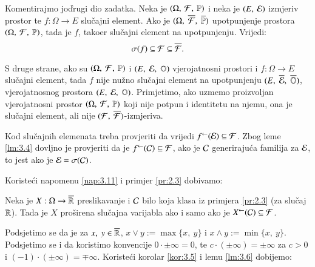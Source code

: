 \begin{rj}
    Komentirajmo jo\v drugi dio zadatka.
    Neka je $(\Omega, \: \mathcal{F}, \: \mathbb{P})$ i neka je $({E}, \: {\mathcal{E}})$ izmjeriv prostor te $f: \Omega \to E$ slu\v cajni element.
    Ako je $(\Omega, \; \overline{\mathcal{F}}, \; \overline{\mathbb{P}})$ upotpunjenje prostora $(\Omega, \: \mathcal{F}, \: \mathbb{P})$, tada je $f$, tako\dj er slu\v cajni element na upotpunjenju.
    Vrijedi:
    \begin{equation*}
        \sigma({f}) \subseteq \mathcal{F} \subseteq \overline{\mathcal{F}}.
    \end{equation*}

    S druge strane, ako su $(\Omega, \: \mathcal{F}, \: \mathbb{P})$ i $(E, \; \mathcal{E}, \; \mathbb{O})$ vjerojatnosni prostori i $f: \Omega \to E$ slu\v cajni element, tada $f$ nije nu\v zno slu\v cajni element na upotpunjenju $(E, \; \overline{\mathcal{E}}, \; \overline{\mathbb{O}})$, vjerojatnosnog prostora $(E, \; \mathcal{E}, \; \mathbb{O})$.
    Primjetimo, ako uzmemo proizvoljan vjerojatnosni prostor $(\Omega, \: \mathcal{F}, \: \mathbb{P})$ koji nije potpun i identitetu na njemu, ona je slu\v cajni element, ali nije $({\mathcal{F}}, \: {\overline{\mathcal{F}}})$-izmjeriva.
\end{rj}

\begin{nap} \label{nap:3.11}
    Kod slu\v cajnih elemenata treba provjeriti da vrijedi ${f}^{\leftarrow}(\mathcal{E}) \subseteq \mathcal{F}$. Zbog leme \ref{lm:3.4} dovljno je provjeriti da je ${f}^{\leftarrow}(\mathcal{C}) \subseteq \mathcal{F}$, ako je $\mathcal{C}$ generiraju\' ca familija za $\mathcal{E}$, to jest ako je $\mathcal{E} = \sigma({\mathcal{C}})$.
\end{nap}

Koriste\' ci napomenu \ref{nap:3.11} i primjer \ref{pr:2.3} dobivamo:

\begin{kor} \label{kor:3.12}
    Neka je $X : \Omega \to \overline{\mathbb{R}}$ preslikavanje i $\mathcal{C}$ bilo koja klasa iz primjera \ref{pr:2.3} (za slu\v caj $\mathbb{R}$).
    Tada je $X$ pro\v sirena slu\v cajna varijabla ako i samo ako je ${X}^{\leftarrow}(\mathcal{C}) \subseteq \mathcal{F}$.
\end{kor}

Podsjetimo se da je za $x, \; y \in \overline{\mathbb{R}}$, $x \lor y := \max \{x, \: y\}$ i $x \land y := \min \{x, \: y\}$.
Podsjetimo se i da koristimo konvencije $0 \cdot \pm \infty = 0$, te $c \cdot (\pm \infty) = \pm \infty$ za $c > 0$ i $(-1) \cdot (\pm \infty) = \mp \infty$. Koriste\' ci korolar \ref{kor:3.5} i lemu \ref{lm:3.6} dobijemo:

